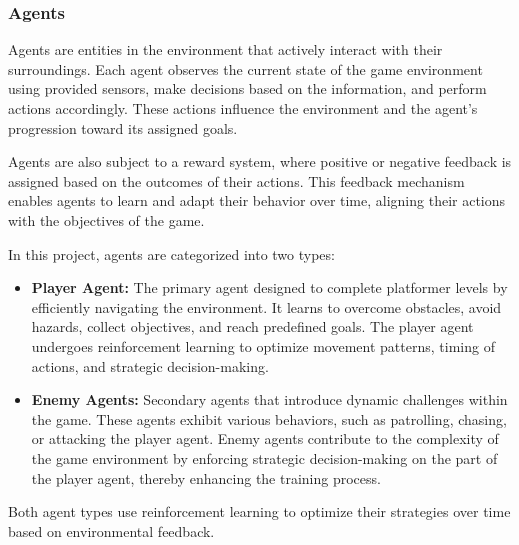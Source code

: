 \documentclass[12pt,oneside,openright,a4paper]{cpe-english-project}
\begin{document}
\subsubsection{Agents}
Agents are entities in the environment that actively interact with their surroundings. Each agent observes the current state of the game environment using provided sensors, make decisions based on the information, and perform actions accordingly. These actions influence the environment and the agent's progression toward its assigned goals.\par
Agents are also subject to a reward system, where positive or negative feedback is assigned based on the outcomes of their actions. This feedback mechanism enables agents to learn and adapt their behavior over time, aligning their actions with the objectives of the game.\par
In this project, agents are categorized into two types:
\begin{itemize}
\item  \textbf{Player Agent:} The primary agent designed to complete platformer levels by efficiently navigating the environment. It learns to overcome obstacles, avoid hazards, collect objectives, and reach predefined goals. The player agent undergoes reinforcement learning to optimize movement patterns, timing of actions, and strategic decision-making.
\item  \textbf{Enemy Agents:} Secondary agents that introduce dynamic challenges within the game. These agents exhibit various behaviors, such as patrolling, chasing, or attacking the player agent. Enemy agents contribute to the complexity of the game environment by enforcing strategic decision-making on the part of the player agent, thereby enhancing the training process.
\end{itemize}
Both agent types use reinforcement learning to optimize their strategies over time based on environmental feedback.\par
\end{document}
